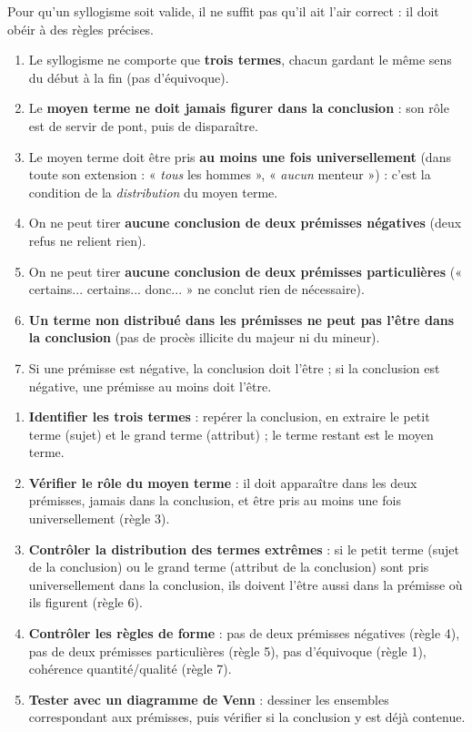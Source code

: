 \documentclass[11pt]{article}
\newcounter{popsec}
\newcounter{popsub}
\newcommand{\courssub}[1]{%
  \stepcounter{popsub}%
  \par\vspace{9pt}\noindent{\popxbold\fontsize{11.5}{13}\selectfont\color{popink}{\color{poporange}\thepopsec.\thepopsub}\hspace{6pt}#1}\par\nopagebreak\vspace{4pt}
}
\begin{document}
\courssub{Les règles de validité du syllogisme}

Pour qu'un syllogisme soit valide, il ne suffit pas qu'il ait l'air correct : il doit obéir à des règles précises.

\begin{aretenir}
\begin{enumerate}
\item Le syllogisme ne comporte que \textbf{trois termes}, chacun gardant le même sens du début à la fin (pas d'équivoque).
\item Le \textbf{moyen terme ne doit jamais figurer dans la conclusion} : son rôle est de servir de pont, puis de disparaître.
\item Le moyen terme doit être pris \textbf{au moins une fois universellement} (dans toute son extension : « \emph{tous} les hommes », « \emph{aucun} menteur ») : c'est la condition de la \emph{distribution} du moyen terme.
\item On ne peut tirer \textbf{aucune conclusion de deux prémisses négatives} (deux refus ne relient rien).
\item On ne peut tirer \textbf{aucune conclusion de deux prémisses particulières} (« certains... certains... donc... » ne conclut rien de nécessaire).
\item \textbf{Un terme non distribué dans les prémisses ne peut pas l'être dans la conclusion} (pas de procès illicite du majeur ni du mineur).
\item Si une prémisse est négative, la conclusion doit l'être ; si la conclusion est négative, une prémisse au moins doit l'être.
\end{enumerate}
\end{aretenir}

\begin{methode}
\begin{enumerate}
\item \textbf{Identifier les trois termes} : repérer la conclusion, en extraire le petit terme (sujet) et le grand terme (attribut) ; le terme restant est le moyen terme.
\item \textbf{Vérifier le rôle du moyen terme} : il doit apparaître dans les deux prémisses, jamais dans la conclusion, et être pris au moins une fois universellement (règle 3).
\item \textbf{Contrôler la distribution des termes extrêmes} : si le petit terme (sujet de la conclusion) ou le grand terme (attribut de la conclusion) sont pris universellement dans la conclusion, ils doivent l'être aussi dans la prémisse où ils figurent (règle 6).
\item \textbf{Contrôler les règles de forme} : pas de deux prémisses négatives (règle 4), pas de deux prémisses particulières (règle 5), pas d'équivoque (règle 1), cohérence quantité/qualité (règle 7).
\item \textbf{Tester avec un diagramme de Venn} : dessiner les ensembles correspondant aux prémisses, puis vérifier si la conclusion y est déjà contenue.
\end{enumerate}
\end{methode}
\end{document}
